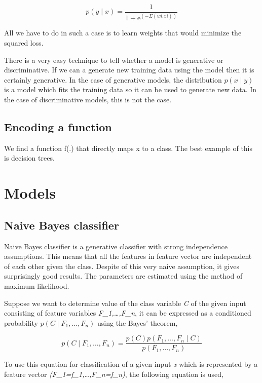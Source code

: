 \begin{equation}
  p(y\mid x) = \frac{1}{1 + \mathrm{e}^{(-\Sigma(wi.xi))}}
\end{equation}

All we have to do in such a case is to learn weights that would minimize the squared loss.

\par
There is a very easy technique to tell whether a model is generative or discriminative. If we can a generate new training data
using the model then it is certainly generative. In the case of generative models, the distribution \(p(x\mid y)\) is a model 
which fits the training data so it can be used to generate new data. In the case of discriminative models, this is not the case.

\subsection{Encoding a function}
We find a function f(.) that directly maps x to a class. The best example of this is decision trees. 

\section{Models}

\subsection{Naive Bayes classifier}
\par
Naive Bayes classifier is a generative classifier with strong independence assumptions. This means that all the features in feature
vector are independent of each other given the class. Despite of this very naive assumption, it gives surprisingly good results.
The parameters are estimated using the method of maximum likelihood.

Suppose we want to determine value of the class variable \textit{C} of the given input consisting of feature variables \textit{F_1,\dots,F_n}, 
it can be expressed as a conditioned probability \(p(C\mid F_1,\dots,F_n)\) using the Bayes' theorem,

\begin{equation}  
p(C\mid F_1,\dots,F_n) = \frac{p(C)p(F_1,\dots,F_n\mid C)}{p(F_1,\dots,F_n)}
\end{equation}

To use this equation for classification of a given input \textit{x} which is represented by a feature vector \textit{(F_1=f_1,\dots,F_n=f_n)},
the following equation is used,

